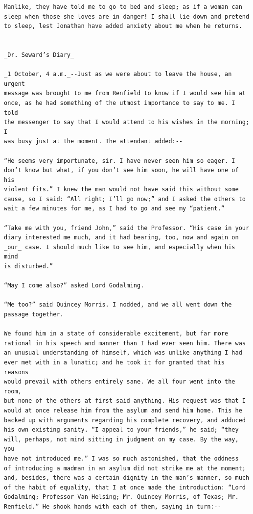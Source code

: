 \documentclass{article}
\begin{document}
\begin{verbatim}
Manlike, they have told me to go to bed and sleep; as if a woman can
sleep when those she loves are in danger! I shall lie down and pretend
to sleep, lest Jonathan have added anxiety about me when he returns.


_Dr. Seward’s Diary_

_1 October, 4 a.m._--Just as we were about to leave the house, an urgent
message was brought to me from Renfield to know if I would see him at
once, as he had something of the utmost importance to say to me. I told
the messenger to say that I would attend to his wishes in the morning; I
was busy just at the moment. The attendant added:--

“He seems very importunate, sir. I have never seen him so eager. I
don’t know but what, if you don’t see him soon, he will have one of his
violent fits.” I knew the man would not have said this without some
cause, so I said: “All right; I’ll go now;” and I asked the others to
wait a few minutes for me, as I had to go and see my “patient.”

“Take me with you, friend John,” said the Professor. “His case in your
diary interested me much, and it had bearing, too, now and again on
_our_ case. I should much like to see him, and especially when his mind
is disturbed.”

“May I come also?” asked Lord Godalming.

“Me too?” said Quincey Morris. I nodded, and we all went down the
passage together.

We found him in a state of considerable excitement, but far more
rational in his speech and manner than I had ever seen him. There was
an unusual understanding of himself, which was unlike anything I had
ever met with in a lunatic; and he took it for granted that his reasons
would prevail with others entirely sane. We all four went into the room,
but none of the others at first said anything. His request was that I
would at once release him from the asylum and send him home. This he
backed up with arguments regarding his complete recovery, and adduced
his own existing sanity. “I appeal to your friends,” he said; “they
will, perhaps, not mind sitting in judgment on my case. By the way, you
have not introduced me.” I was so much astonished, that the oddness
of introducing a madman in an asylum did not strike me at the moment;
and, besides, there was a certain dignity in the man’s manner, so much
of the habit of equality, that I at once made the introduction: “Lord
Godalming; Professor Van Helsing; Mr. Quincey Morris, of Texas; Mr.
Renfield.” He shook hands with each of them, saying in turn:--


\end{verbatim}
\end{document}
